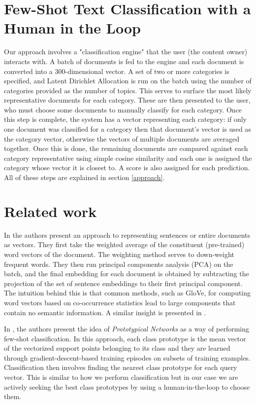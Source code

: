 \documentclass{article} %
\begin{document}
\section{Few-Shot Text Classification with a Human in the Loop}
Our approach involves a "classification engine" that the user (the content owner) interacts with. A batch of documents is fed to the engine and each document is converted into a 300-dimensional vector. A set of two or more categories is specified, and Latent Dirichlet Allocation is run on the batch using the number of categories provided as the number of topics. This serves to surface the most likely representative documents for each category. These are then presented to the user, who must choose some documents to manually classify for each category. Once this step is complete, the system has a vector representing each category: if only one document was classified for a category then that document's vector is used as the category vector, otherwise the vectors of multiple documents are averaged together. Once this is done, the remaining documents are compared against each category representative using simple cosine similarity and each one is assigned the category whose vector it is closest to. A score is also assigned for each prediction. All of these steps are explained in section \ref{approach}.

\section{Related work}
In \citep{arora2017asimple} the authors present an approach to representing sentences or entire documents as vectors. They first take the weighted average of the constituent (pre-trained) word vectors of the document. The weighting method serves to down-weight frequent words. They then run principal components analysis (PCA) on the batch, and the final embedding for each document is obtained by subtracting the projection of the set of sentence embeddings to their first principal component. The intuition behind this is that common methods, such as GloVe, for computing word vectors based on co-occurrence statistics lead to large components that contain no semantic information. A similar insight is presented in \citep{mu2017allbuttop}.

In \citep{snell2017prototypical}, the authors present the idea of \textit{Prototypical Networks} as a way of performing few-shot classification. In this approach, each class prototype is the mean vector of the vectorized support points belonging to its class and they are learned through gradient-descent-based training episodes on subsets of training examples. Classification then involves finding the nearest class prototype for each query vector. This is similar to how we perform classification but in our case we are actively seeking the best class prototypes by using a human-in-the-loop to choose them.
\end{document}
